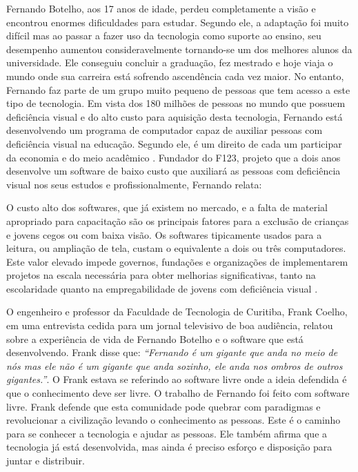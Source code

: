 Fernando Botelho, aos 17 anos de idade, perdeu completamente a visão e encontrou enormes dificuldades para estudar. Segundo ele, a adaptação foi muito difícil mas ao passar a fazer uso da tecnologia como suporte ao ensino, seu desempenho aumentou consideravelmente tornando-se um dos melhores alunos da universidade. Ele conseguiu concluir a graduação, fez mestrado e hoje viaja o mundo onde sua carreira está sofrendo ascendência cada vez maior. No entanto, Fernando faz parte de um grupo muito pequeno de pessoas que tem acesso a este tipo de tecnologia. Em vista dos 180 milhões de pessoas no mundo que possuem deficiência visual e do alto custo para aquisição desta tecnologia, Fernando está desenvolvendo um programa de computador capaz de auxiliar pessoas com deficiência visual na educação. Segundo ele, é um direito de cada um participar da economia e do meio acadêmico \cite{botelho}. Fundador do F123, projeto que a dois anos desenvolve um software de baixo custo que auxiliará as pessoas com deficiência visual nos seus estudos e profissionalmente, Fernando relata:

\begin{citacao}
O custo alto dos softwares, que já existem no mercado, e a falta de material apropriado para capacitação são os principais fatores para a exclusão de crianças e jovens cegos ou com baixa visão. Os softwares tipicamente usados para a leitura, ou ampliação de tela, custam o equivalente a dois ou três computadores. Este valor elevado impede governos, fundações e organizações de implementarem projetos na escala necessária para obter melhorias significativas, tanto na escolaridade quanto na empregabilidade de jovens com deficiência visual \cite{botelho}.
\end{citacao}

O engenheiro e professor da Faculdade de Tecnologia de Curitiba, Frank Coelho, em uma entrevista cedida para um jornal televisivo de boa audiência, relatou sobre a experiência de vida de Fernando Botelho e o software que está desenvolvendo. Frank disse que: \textit{``Fernando é um gigante que anda no meio de nós mas ele não é um gigante que anda sozinho, ele anda nos ombros de outros gigantes.''}. O Frank estava se referindo ao software livre onde a ideia defendida é que o conhecimento deve ser livre. O trabalho de Fernando foi feito com software livre. Frank defende que esta comunidade pode quebrar com paradigmas e revolucionar a civilização levando o conhecimento as pessoas. Este é o caminho para se conhecer a tecnologia e ajudar as pessoas. Ele também afirma que a tecnologia já está desenvolvida, mas ainda é preciso esforço e disposição para juntar e distribuir.

